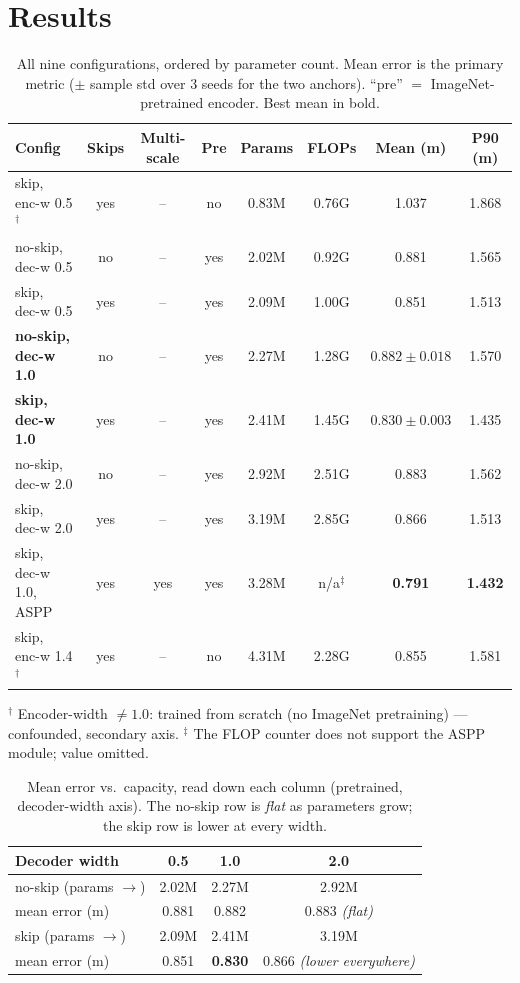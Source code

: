 \documentclass[11pt]{article}
\newcommand{\best}[1]{\textbf{#1}}
\begin{document}
\section{Results}
\begin{table}[h]
\centering
\caption{All nine configurations, ordered by parameter count. Mean error is the primary
metric ($\pm$ sample std over 3 seeds for the two anchors). ``pre'' $=$ ImageNet-pretrained
encoder. Best mean in bold.}
\setlength{\tabcolsep}{4.5pt}\small
\begin{tabular}{lccccccc}
\toprule
Config & Skips & Multi-scale & Pre & Params & FLOPs & Mean (m) & P90 (m) \\
\midrule
skip, enc-w 0.5$^\dagger$        & yes & -- & no  & 0.83M & 0.76G & 1.037           & 1.868 \\
no-skip, dec-w 0.5               & no  & -- & yes & 2.02M & 0.92G & 0.881           & 1.565 \\
skip, dec-w 0.5                  & yes & -- & yes & 2.09M & 1.00G & 0.851           & 1.513 \\
\textbf{no-skip, dec-w 1.0}      & no  & -- & yes & 2.27M & 1.28G & $0.882\pm0.018$ & 1.570 \\
\textbf{skip, dec-w 1.0}         & yes & -- & yes & 2.41M & 1.45G & $0.830\pm0.003$ & 1.435 \\
no-skip, dec-w 2.0               & no  & -- & yes & 2.92M & 2.51G & 0.883           & 1.562 \\
skip, dec-w 2.0                  & yes & -- & yes & 3.19M & 2.85G & 0.866           & 1.513 \\
skip, dec-w 1.0, ASPP            & yes & yes& yes & 3.28M & n/a$^\ddagger$ & \best{0.791} & \best{1.432} \\
skip, enc-w 1.4$^\dagger$        & yes & -- & no  & 4.31M & 2.28G & 0.855           & 1.581 \\
\bottomrule
\end{tabular}
\end{table}
{\footnotesize $^\dagger$ Encoder-width $\neq1.0$: trained from scratch (no ImageNet
pretraining) --- confounded, secondary axis. $^\ddagger$ The FLOP counter does not support the
ASPP module; value omitted.}

\begin{table}[h]
\centering
\caption{Mean error vs.\ capacity, read down each column (pretrained, decoder-width axis).
The no-skip row is \emph{flat} as parameters grow; the skip row is lower at every width.}
\begin{tabular}{lccc}
\toprule
Decoder width & 0.5 & 1.0 & 2.0 \\
\midrule
no-skip \; (params $\to$)  & 2.02M & 2.27M & 2.92M \\
\quad mean error (m)       & 0.881 & 0.882 & 0.883 \;\;\emph{(flat)} \\
\midrule
skip \; (params $\to$)     & 2.09M & 2.41M & 3.19M \\
\quad mean error (m)       & 0.851 & \best{0.830} & 0.866 \;\;\emph{(lower everywhere)} \\
\bottomrule
\end{tabular}
\end{table}
\end{document}
